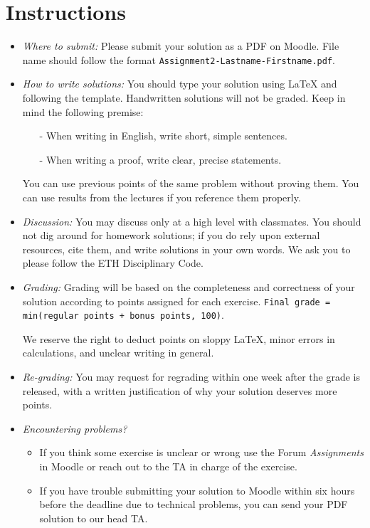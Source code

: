 \section*{Instructions}
\begin{itemize}
    \item \emph{Where to submit:} Please submit your solution as a PDF on Moodle. File name should follow the format \texttt{Assignment2-Lastname-Firstname.pdf}. 
    
    \item \emph{How to write solutions:} You should type your solution using LaTeX and following the template. Handwritten solutions will not be graded. Keep in mind the following premise: 
    \begin{itemize}
        \item[-] When writing in English, write short, simple sentences.
        \item[-] When writing a proof, write clear, precise statements. 
    \end{itemize}
    You can use previous points of the same problem without proving them. You can use results from the lectures if you reference them properly.
       
    \item \emph{Discussion:} You may discuss only at a high level with classmates. You should not dig around for homework solutions; if you do rely upon external resources, cite them, and write solutions in your own words. We ask you to please follow the ETH Disciplinary Code. 

    
    \item \emph{Grading:} Grading will be based on the completeness and correctness of your solution according to points assigned for each exercise. \texttt{Final grade = min(regular points + bonus points, 100)}.

    We reserve the right to deduct points on sloppy \LaTeX, minor errors in calculations, and unclear writing in general.
    
    \item \emph{Re-grading:} You may request for regrading within one week after the grade is released, with a written justification of why your solution deserves more points.

     
    \item \emph{Encountering problems?} 
    \begin{itemize}
        \item If you think some exercise is unclear or wrong use the Forum \textit{Assignments} in Moodle or reach out to the TA in charge of the exercise. 
        \item If you have trouble submitting your solution to Moodle within six hours before the deadline due to technical problems, you can send your PDF solution to our head TA. 
    \end{itemize}
\end{itemize}